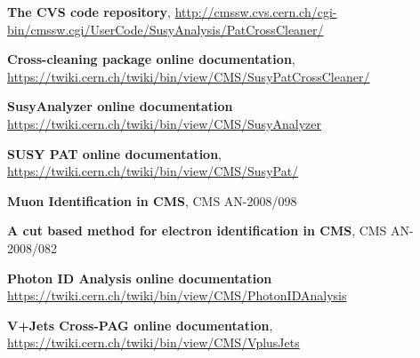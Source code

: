 \documentclass{cmspaper}
\begin{document}
\pagebreak
\begin{thebibliography}{9}
 {\bf The CVS code repository},
\underline{http://cmssw.cvs.cern.ch/cgi-bin/cmssw.cgi/UserCode/SusyAnalysis/PatCrossCleaner/}

 {\bf Cross-cleaning package online documentation},
\underline{https://twiki.cern.ch/twiki/bin/view/CMS/SusyPatCrossCleaner/}

 {\bf SusyAnalyzer online documentation}
\underline{https://twiki.cern.ch/twiki/bin/view/CMS/SusyAnalyzer}

 {\bf SUSY PAT online documentation},
\underline{https://twiki.cern.ch/twiki/bin/view/CMS/SusyPat/}

 {\bf Muon Identification in CMS}, CMS AN-2008/098 

 {\bf A cut based method for electron identification in CMS}, CMS AN-2008/082 

 {\bf Photon ID Analysis online documentation} 
\underline{https://twiki.cern.ch/twiki/bin/view/CMS/PhotonIDAnalysis}

 {\bf V+Jets Cross-PAG online documentation},
\underline{https://twiki.cern.ch/twiki/bin/view/CMS/VplusJets}

\end{thebibliography}

\end{document}
